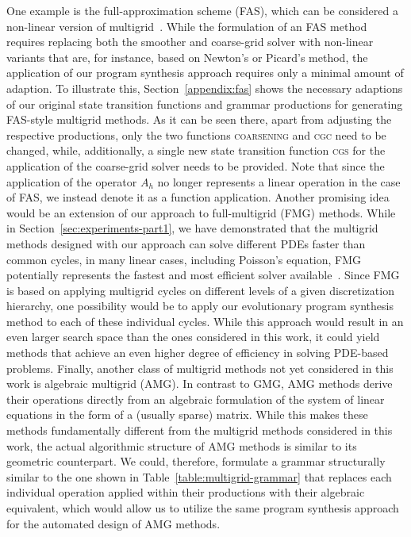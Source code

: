 One example is the full-approximation scheme (FAS), which can be considered a non-linear version of multigrid~\cite{trottenberg2000multigrid,briggs2000multigrid}.
While the formulation of an FAS method requires replacing both the smoother and coarse-grid solver with non-linear variants that are, for instance, based on Newton's or Picard's method, the application of our program synthesis approach requires only a minimal amount of adaption.
To illustrate this, Section~\ref{appendix:fas} shows the necessary adaptions of our original state transition functions and grammar productions for generating FAS-style multigrid methods. 
As it can be seen there, apart from adjusting the respective productions, only the two functions \textsc{coarsening} and \textsc{cgc} need to be changed, while, additionally, a single new state transition function \textsc{cgs} for the application of the coarse-grid solver needs to be provided. 
Note that since the application of the operator $A_h$ no longer represents a linear operation in the case of FAS, we instead denote it as a function application.
Another promising idea would be an extension of our approach to full-multigrid (FMG) methods.
While in Section~\ref{sec:experiments-part1}, we have demonstrated that the multigrid methods designed with our approach can solve different PDEs faster than common cycles, in many linear cases, including Poisson's equation, FMG potentially represents the fastest and most efficient solver available~\cite{trottenberg2000multigrid}.
Since FMG is based on applying multigrid cycles on different levels of a given discretization hierarchy, one possibility would be to apply our evolutionary program synthesis method to each of these individual cycles.
While this approach would result in an even larger search space than the ones considered in this work, it could yield methods that achieve an even higher degree of efficiency in solving PDE-based problems.
Finally, another class of multigrid methods not yet considered in this work is algebraic multigrid (AMG).
In contrast to GMG, AMG methods derive their operations directly from an algebraic formulation of the system of linear equations in the form of a (usually sparse) matrix.
While this makes these methods fundamentally different from the multigrid methods considered in this work, the actual algorithmic structure of AMG methods is similar to its geometric counterpart.
We could, therefore, formulate a grammar structurally similar to the one shown in Table~\ref{table:multigrid-grammar} that replaces each individual operation applied within their productions with their algebraic equivalent, which would allow us to utilize the same program synthesis approach for the automated design of AMG methods.
